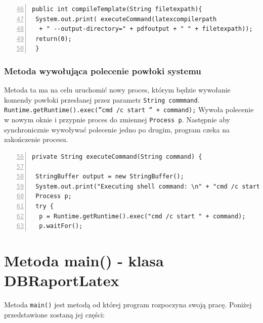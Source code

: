 \begin{lstlisting}[numbers=left,firstnumber=46]
public int compileTemplate(String filetexpath){
 System.out.print( executeCommand(latexcompilerpath
  + " --output-directory=" + pdfoutput + " " + filetexpath));
 return(0);
 }
\end{lstlisting}

\subsubsection*{Metoda wywołująca polecenie powłoki systemu}


Metoda ta ma na celu uruchomić nowy proces, którym będzie wywołanie komendy powłoki przesłanej przez parametr \texttt{String commmand}. \texttt{Runtime.getRuntime().exec(''cmd /c start '' + command);} Wywoła polecenie w nowym oknie i przypnie proces do zmiennej \texttt{Process p}. Następnie aby synchronicznie wywoływać polecenie jedno po drugim, program czeka na zakończenie procesu. 

 \begin{lstlisting}[numbers=left,firstnumber=56]
private String executeCommand(String command) {
 
 StringBuffer output = new StringBuffer();
 System.out.print("Executing shell command: \n" + "cmd /c start " + command);
 Process p;
 try {
  p = Runtime.getRuntime().exec("cmd /c start " + command);
  p.waitFor();

\end{lstlisting}

\section{Metoda main() - klasa DBRaportLatex }

Metoda \texttt{main()} jest metodą od której program rozpoczyna swoją pracę. Poniżej przedstawione zostaną jej części:

